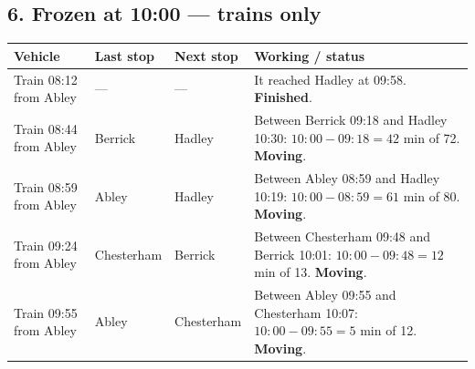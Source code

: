 \documentclass[11pt,a4paper]{article}
\newcommand{\ans}[1]{\textcolor{red!75!black}{\textbf{#1}}}
\begin{document}
\subsection*{6. Frozen at 10:00 --- trains only}
\begin{tabularx}{\linewidth}{@{}l l l X@{}}
\toprule
Vehicle & Last stop & Next stop & Working / status\\
\midrule
Train 08:12 from Abley & --- & --- & It reached Hadley at 09:58. \ans{Finished}.\\
Train 08:44 from Abley & Berrick & Hadley & Between Berrick 09:18 and Hadley 10:30: \(10{:}00-09{:}18=42\) min of 72. \ans{Moving}.\\
Train 08:59 from Abley & Abley & Hadley & Between Abley 08:59 and Hadley 10:19: \(10{:}00-08{:}59=61\) min of 80. \ans{Moving}.\\
Train 09:24 from Abley & Chesterham & Berrick & Between Chesterham 09:48 and Berrick 10:01: \(10{:}00-09{:}48=12\) min of 13. \ans{Moving}.\\
Train 09:55 from Abley & Abley & Chesterham & Between Abley 09:55 and Chesterham 10:07: \(10{:}00-09{:}55=5\) min of 12. \ans{Moving}.\\
\bottomrule
\end{tabularx}
\end{document}
